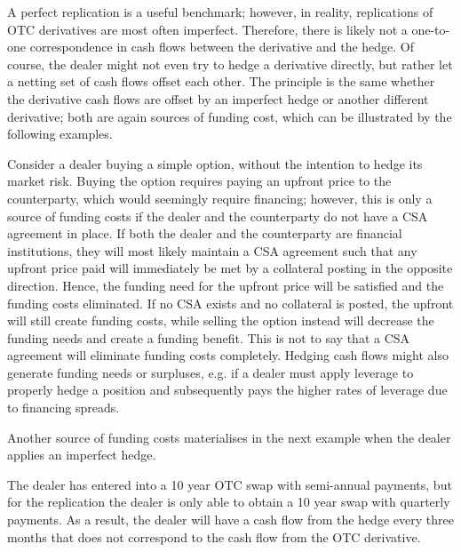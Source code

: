 \documentclass[main.tex]{subfiles}
\begin{document}
        A perfect replication is a useful benchmark;
        however, in reality, replications of OTC derivatives are most often imperfect.
        Therefore, there is likely not a one-to-one correspondence 
        in cash flows between the derivative and the hedge.
        Of course, the dealer might not even try to hedge a derivative directly,
        but rather let a netting set of cash flows offset each other. 
        The principle is the same whether the derivative cash flows are offset by an imperfect hedge
        or another different derivative;
        both are again sources of funding cost, which can be illustrated by the following examples.

        \begin{example}
        Consider a dealer buying a simple option, without the intention to hedge its market risk.
        Buying the option requires paying an upfront price to the counterparty,
        which would seemingly require financing;
        however, this is only a source of funding costs 
        if the dealer and the counterparty do not have a CSA agreement in place.
        If both the dealer and the counterparty are financial institutions, 
        they will most likely maintain a CSA agreement
        such that any upfront price paid will immediately be met by a collateral posting in the opposite direction.
        Hence, the funding need for the upfront price will be satisfied and the funding costs eliminated.
        If no CSA exists and no collateral is posted, the upfront will still create funding costs,
        while selling the option instead will decrease the funding needs and create a funding benefit.
        This is not to say that a CSA agreement will eliminate funding costs completely. 
        Hedging cash flows might also generate funding needs or surpluses, 
        e.g. if a dealer must apply leverage to properly hedge a position 
        and subsequently pays the higher rates of leverage due to financing spreads.
        \end{example}

        Another source of funding costs materialises in the next example when the dealer applies an imperfect hedge.
        
        \begin{example}
        The dealer has entered into a 10 year OTC swap with semi-annual payments, 
        but for the replication the dealer is only able to obtain a 10 year swap with quarterly payments.
        As a result, the dealer will have a cash flow from the hedge every three months
        that does not correspond to the cash flow from the OTC derivative. 
        \end{example}
    
\end{document}
